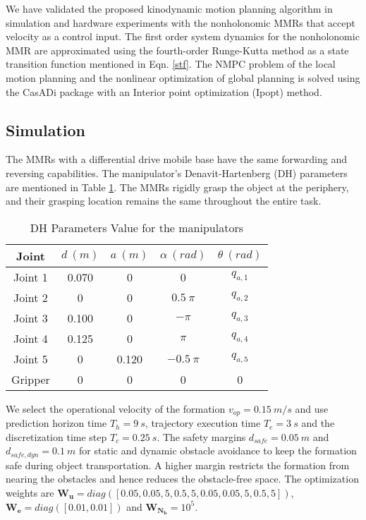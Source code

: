 We have validated the proposed kinodynamic motion planning algorithm in simulation and hardware experiments with the nonholonomic MMRs that accept velocity as a control input. The first order system dynamics for the nonholonomic MMR are approximated using the fourth-order Runge-Kutta method as a state transition function mentioned in Eqn. \eqref{stf}. The NMPC problem of the local motion planning and the nonlinear optimization of global planning is solved using the CasADi package \cite{2019_Andersson} with an Interior point optimization (Ipopt) method.

\subsection{Simulation}
The MMRs with a differential drive mobile base have the same forwarding and reversing capabilities. The manipulator's Denavit-Hartenberg (DH) parameters are mentioned in Table \ref{tab:0}. The MMRs rigidly grasp the object at the periphery, and their grasping location remains the same throughout the entire task.

\begin{table}[htbp]
	\caption{DH Parameters Value for the manipulators}
	\label{tab:0}
	\begin{center}
		\begin{tabular}{|c|c|c|c|c|}
			\hline
			\textbf{Joint} & $d\ (m)$ & $a\ (m)$ & $\alpha\ (rad)$& $\theta\ (rad)$\\
			\hline
			Joint 1 & 0.070 & 0 & 0 & $q_{a,1}$\\
			\hline
			Joint 2 & 0 & 0 & $0.5\ \pi$ & $q_{a,2}$\\
			\hline
			Joint 3 & 0.100 & 0 & $- \pi$ & $q_{a,3}$\\
			\hline
			Joint 4 & 0.125 & 0 & $ \pi$ & $q_{a,4}$\\
			\hline
			Joint 5 & 0 & 0.120 & $-0.5\ \pi$ & $q_{a,5}$\\
			\hline
			Gripper & 0 & 0 & 0 & 0\\
			\hline
		\end{tabular}
	\end{center}
\end{table}

We select the operational velocity of the formation $v_{op} = 0.15\ m/s$ and use prediction horizon time $T_h = 9\ s$, trajectory execution time $T_e = 3\ s$ and the discretization time step $T_c = 0.25\ s$. The safety margins  $d_{safe} = 0.05\ m$ and $d_{safe,dyn} = 0.1\ m$ for static and dynamic obstacle avoidance to keep the formation safe during object transportation. A higher margin restricts the formation from nearing the obstacles and hence reduces the obstacle-free space. The optimization weights are $\mathbf{W_u} = diag([0.05,0.05,5,0.5,5,0.05,0.05,5,0.5,5])$, $\mathbf{W_e} = diag([0.01,0.01])$ and $\mathbf{W_{N_h}} = 10^5$.


